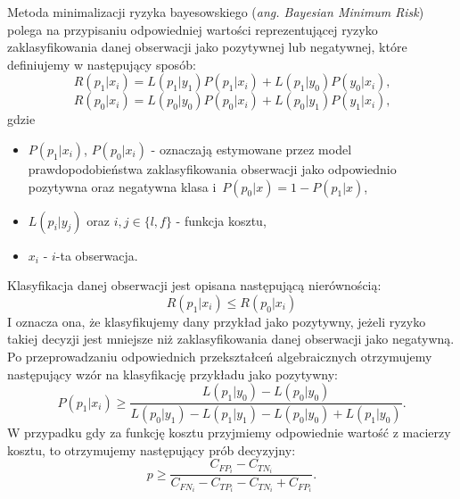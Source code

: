 \documentclass[inzynierska]{pwr_wmat_praca_dyplomowa}
\theoremstyle{plain}
\numberwithin{theorem}{chapter}
\theoremstyle{definition}
\numberwithin{theorem}{chapter}
\begin{document}
Metoda minimalizacji ryzyka bayesowskiego (\textit{ang. Bayesian Minimum Risk}) polega na przypisaniu odpowiedniej wartości reprezentującej ryzyko zaklasyfikowania danej obserwacji jako pozytywnej lub negatywnej, które definiujemy w następujący sposób:
$$ R(p_1|x_i) = L(p_1|y_1)P(p_1|x_i) + L(p_1|y_0)P(y_0|x_i) \text{,}$$
$$ R(p_0|x_i) = L(p_0|y_0)P(p_0|x_i) + L(p_0|y_1)P(y_1|x_i) \text{,}$$
gdzie
\begin{itemize}
	\item $P(p_1|x_i)$, $P(p_0|x_i)$ - oznaczają estymowane przez model prawdopodobieństwa zaklasyfikowania obserwacji jako odpowiednio pozytywna oraz negatywna klasa i~$P(p_0|x) = 1 - P(p_1|x)$,
	\item $L(p_{i}|y_{j})$ oraz $i,j \in \{l,f\}$ - funkcja kosztu,
	\item $x_i$ - $i$-ta obserwacja.
\end{itemize}{}
Klasyfikacja danej obserwacji jest opisana następującą nierównością:
$$ R(p_1|x_i) \leq R(p_0|x_i)$$
I oznacza ona, że klasyfikujemy dany przykład jako pozytywny, jeżeli ryzyko takiej decyzji jest mniejsze niż zaklasyfikowania danej obserwacji jako negatywną. 
Po przeprowadzaniu odpowiednich przekształceń algebraicznych otrzymujemy następujący wzór na klasyfikację przykładu jako pozytywny:
$$ P(p_1|x_i) \ge \frac{L(p_1|y_0) - L(p_0|y_0)}{L(p_0|y_1) - L(p_1|y_1) - L(p_0|y_0) + L(p_1|y_0)} \text{.}$$
W przypadku gdy za funkcję kosztu przyjmiemy odpowiednie wartość z macierzy kosztu, to otrzymujemy następujący prób decyzyjny:
$$ p \ge \frac{C_{FP_i} - C_{TN_i}}{C_{FN_i} - C_{TP_i} - C_{TN_i} + C_{FP_i}} \text{.}$$
\end{document}
